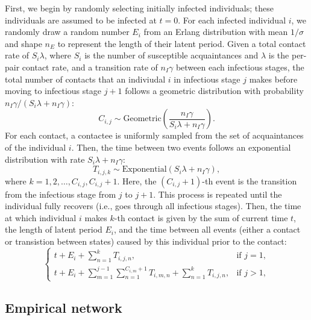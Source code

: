 \documentclass[12pt]{article}
\begin{document}
First, we begin by randomly selecting initially infected individuals; these individuals are assumed to be infected at $t = 0$.
For each infected individual $i$, we randomly draw a random number $E_i$ from an Erlang distribution with mean $1/\sigma$ and shape $n_E$ to represent the length of their latent period.
Given a total contact rate of $S_i \lambda$, where $S_i$ is the number of susceptible acquaintances and $\lambda$ is the per-pair contact rate, and a transition rate of $n_I \gamma$ between each infectious stages, 
the total number of contacts that an indiviudal $i$ in infectious stage $j$ makes before moving to infectious stage $j+1$ follows a geometric distribution with probability $n_I\gamma/(S_i \lambda + n_I\gamma)$:
\begin{equation}
C_{i, j} \sim \mathrm{Geometric}\left(\frac{n_I\gamma}{S_i \lambda + n_I\gamma}\right).
\end{equation}
For each contact, a contactee is uniformly sampled from the set of acquaintances of the individual $i$.
Then, the time between two events follows an exponential distribution with rate $S_i \lambda + n_I\gamma$:
\begin{equation}
T_{i, j, k} \sim \mathrm{Exponential}\left(S_i \lambda + n_I\gamma\right),
\end{equation}
where $k = 1, 2, \dots, C_{i, j}, C_{i, j} + 1$. Here, the $(C_{i, j} + 1)$-th event is the transition from the infectious stage from $j$ to $j+1$.
This process is repeated until the individual fully recovers (i.e., goes through all infectious stages).
Then, the time at which individual $i$ makes $k$-th contact is given by the sum of current time $t$, the length of latent period $E_i$, and the time between all events (either a contact or transistion between states) caused by this individual prior to the contact:
\begin{equation}
\begin{cases}
t + E_i + \sum_{n=1}^k T_{i, j, n}, & \text{if } j = 1,\\
t + E_i + \sum_{m=1}^{j-1} \sum_{n=1}^{C_{i, m} + 1} T_{i, m, n} + \sum_{n=1}^k T_{i, j, n}, & \text{if } j > 1,
\end{cases}
\end{equation}



\subsection{Empirical network}


\end{document}
